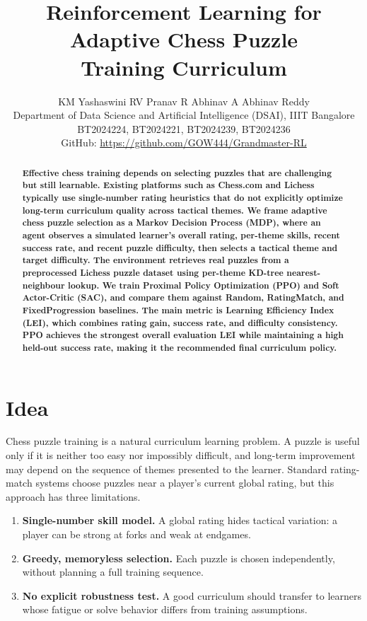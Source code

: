\documentclass[10pt,twocolumn]{article}
\title{\vspace{-0.35in}\textbf{Reinforcement Learning for Adaptive Chess Puzzle\\Training Curriculum}}
\author{
KM Yashaswini \quad RV Pranav \quad R Abhinav \quad A Abhinav Reddy\\
Department of Data Science and Artificial Intelligence (DSAI), IIIT Bangalore\\
BT2024224, BT2024221, BT2024239, BT2024236\\
\small GitHub: \href{https://github.com/GOW444/Grandmaster-RL}{https://github.com/GOW444/Grandmaster-RL}
}
\date{}
\begin{document}
\maketitle
\vspace{-0.18in}

\begin{abstract}
\textbf{Effective chess training depends on selecting puzzles that are challenging
but still learnable. Existing platforms such as Chess.com and Lichess typically use
single-number rating heuristics that do not explicitly optimize long-term curriculum
quality across tactical themes. We frame adaptive chess puzzle selection as a Markov
Decision Process (MDP), where an agent observes a simulated learner's overall rating,
per-theme skills, recent success rate, and recent puzzle difficulty, then selects a
tactical theme and target difficulty. The environment retrieves real puzzles from a
preprocessed Lichess puzzle dataset using per-theme KD-tree nearest-neighbour lookup.
We train Proximal Policy Optimization (PPO) and Soft Actor-Critic (SAC), and compare
them against Random, RatingMatch, and FixedProgression baselines. The main metric is
Learning Efficiency Index (LEI), which combines rating gain, success rate, and
difficulty consistency. PPO achieves the strongest overall evaluation LEI while
maintaining a high held-out success rate, making it the recommended final curriculum
policy.}
\end{abstract}

\section{Idea}

Chess puzzle training is a natural curriculum learning problem. A puzzle is useful
only if it is neither too easy nor impossibly difficult, and long-term improvement may
depend on the sequence of themes presented to the learner. Standard rating-match
systems choose puzzles near a player's current global rating, but this approach has
three limitations.

\begin{enumerate}[leftmargin=*,itemsep=1pt,topsep=2pt]
    \item \textbf{Single-number skill model.} A global rating hides tactical variation:
    a player can be strong at forks and weak at endgames.
    \item \textbf{Greedy, memoryless selection.} Each puzzle is chosen independently,
    without planning a full training sequence.
    \item \textbf{No explicit robustness test.} A good curriculum should transfer to
    learners whose fatigue or solve behavior differs from training assumptions.
\end{enumerate}
\end{document}
